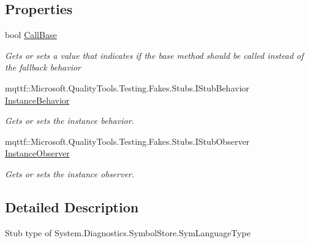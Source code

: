 \subsection*{Properties}
\begin{DoxyCompactItemize}
\item 
bool \hyperlink{class_system_1_1_diagnostics_1_1_symbol_store_1_1_fakes_1_1_stub_sym_language_type_a60fc6a902c4185e752ed5f39c9faebc0}{Call\-Base}
\begin{DoxyCompactList}\small\item\em Gets or sets a value that indicates if the base method should be called instead of the fallback behavior\end{DoxyCompactList}\item 
mqttf\-::\-Microsoft.\-Quality\-Tools.\-Testing.\-Fakes.\-Stubs.\-I\-Stub\-Behavior \hyperlink{class_system_1_1_diagnostics_1_1_symbol_store_1_1_fakes_1_1_stub_sym_language_type_aea6194121eb263289f4404dd90c37c9b}{Instance\-Behavior}
\begin{DoxyCompactList}\small\item\em Gets or sets the instance behavior.\end{DoxyCompactList}\item 
mqttf\-::\-Microsoft.\-Quality\-Tools.\-Testing.\-Fakes.\-Stubs.\-I\-Stub\-Observer \hyperlink{class_system_1_1_diagnostics_1_1_symbol_store_1_1_fakes_1_1_stub_sym_language_type_a9e9bf8171379903d368a338352103e0b}{Instance\-Observer}
\begin{DoxyCompactList}\small\item\em Gets or sets the instance observer.\end{DoxyCompactList}\end{DoxyCompactItemize}


\subsection{Detailed Description}
Stub type of System.\-Diagnostics.\-Symbol\-Store.\-Sym\-Language\-Type




